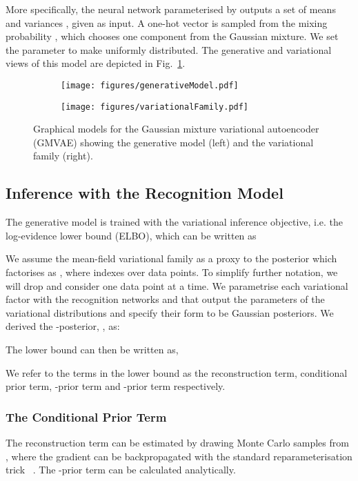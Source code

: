 \documentclass{article} \usepackage{iclr2017_conference,times}
\begin{document}
More specifically, the neural network parameterised by  outputs a set of  means  and  variances , given  as input. A one-hot vector  is sampled from the mixing probability , which chooses one component from the Gaussian mixture. We set the parameter  to make  uniformly distributed. The generative and variational views of this model are depicted in Fig.~\ref{fig:graphModel}.

\begin{figure}[h]
\centering
\begin{subfigure}{0.5\textwidth}
	\centering
	\texttt{[image: figures/generativeModel.pdf]}
\end{subfigure}\begin{subfigure}{0.5\textwidth}
	\centering
	\texttt{[image: figures/variationalFamily.pdf]}
\end{subfigure}\caption{Graphical models for the Gaussian mixture variational autoencoder (GMVAE) showing the generative model (left) and the variational family (right).}
\label{fig:graphModel}
\end{figure}

\subsection{Inference with the Recognition Model}

The generative model is trained with the variational inference objective, i.e. the log-evidence lower bound (ELBO), which can be written as

We assume the mean-field variational family  as a proxy to the posterior which factorises as , where  indexes over data points. To simplify further notation, we will drop  and consider one data point at a time. We parametrise each variational factor with the recognition networks  and  that output the parameters of the variational distributions and specify their form to be Gaussian posteriors. We derived the -posterior, , as:


The lower bound can then be written as,

We refer to the terms in the lower bound as the reconstruction term, conditional prior term, -prior term and -prior term respectively.

\subsubsection{The Conditional Prior Term}
The reconstruction term can be estimated by drawing Monte Carlo samples from , where the gradient can be backpropagated with the standard reparameterisation trick ~\citep{kingma2013auto}. The -prior term can be calculated analytically.
\end{document}
